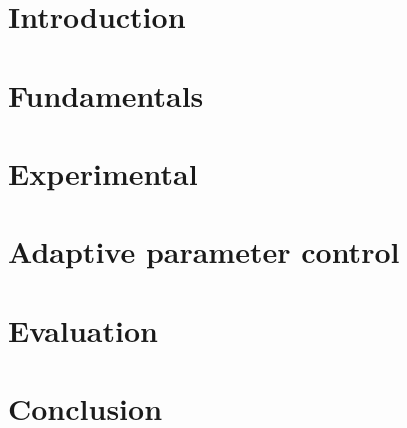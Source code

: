 \section{Introduction}



\section{Fundamentals}



\section{Experimental}



\section{Adaptive parameter control}



\section{Evaluation}



\section{Conclusion}

